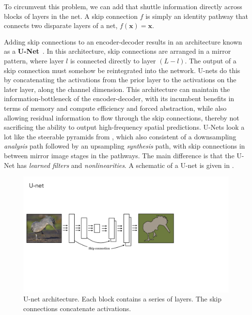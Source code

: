 
To circumvent this problem, we can add  that shuttle information directly across blocks of layers in the net. A skip connection $f$ is simply an identity pathway that connects two disparate layers of a net, $f(\mathbf{x}) = \mathbf{x}$.

Adding skip connections to an encoder-decoder results in an architecture known as a {\bf U-Net}~\cite{ronneberger2015u}. In this architecture, skip connections are arranged in a mirror pattern, where layer $l$ is connected directly to layer $(L-l)$. The output of a skip connection must somehow be reintegrated into the network. U-nets do this by concatenating the activations from the prior layer to the activations on the later layer, along the channel dimension. This architecture can maintain the information-bottleneck of the encoder-decoder, with its incumbent benefits in terms of memory and compute efficiency and forced abstraction, while also allowing residual information to flow through the skip connections, thereby not sacrificing the ability to output high-frequency spatial predictions. U-Nets look a lot like the steerable pyramids from \chap{\ref{chapter:image_pyramids}}, which also consistent of a downsampling \textit{analysis} path followed by an upsampling \textit{synthesis} path, with skip connections in between mirror image stages in the pathways. The main difference is that the U-Net has \textit{learned filters} and \textit{nonlinearities}. A schematic of a U-net is given in \fig{\ref{fig:convolutional_neural_nets:unet}}.
\begin{figure}[h]
    \centerline{
    \includegraphics[width=0.85\linewidth]{./figures/convolutional_neural_nets/unet.pdf}
    }
    \caption{U-net architecture. Each block contains a series of layers. The skip connections concatenate activations.}
    \label{fig:convolutional_neural_nets:unet}
\end{figure}

